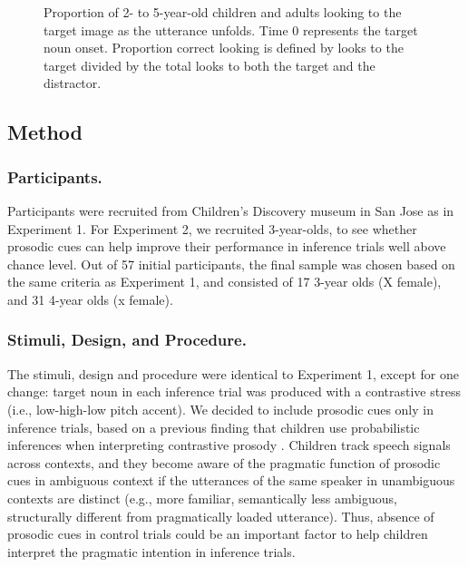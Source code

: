\documentclass[10pt,letterpaper]{article}
\begin{document}
\begin{figure}[t]
	\caption{\label{fig:age} Proportion of 2- to 5-year-old children and adults looking to the target image as the utterance unfolds. Time 0 represents the target noun onset. Proportion correct looking is defined by looks to the target divided by the total looks to both the target and the distractor.}
\end{figure}

\subsection{Method}

\subsubsection{Participants.}

Participants were recruited from Children's Discovery museum in San Jose as in Experiment 1. For Experiment 2, we recruited 3-year-olds, to see whether prosodic cues can help improve their performance in inference trials well above chance level. Out of 57 initial participants, the final sample was chosen based on the same criteria as Experiment 1, and consisted of 17 3-year olds (X female), and 31 4-year olds (x female).


\subsubsection{Stimuli, Design, and Procedure.}

The stimuli, design and procedure were identical to Experiment 1, except for one change: target noun in each inference trial was produced with a contrastive stress (i.e., low-high-low pitch accent). We decided to include prosodic cues only in inference trials, based on a previous finding that children use probabilistic inferences when interpreting contrastive prosody \cite{kurumada1contextual}. Children track speech signals across contexts, and they become aware of the pragmatic function of prosodic cues in ambiguous context if the utterances of the same speaker in unambiguous contexts are distinct (e.g., more familiar, semantically less ambiguous, structurally different from pragmatically loaded utterance). Thus, absence of prosodic cues in control trials could be an important factor to help children interpret the pragmatic intention in inference trials.
\end{document}
